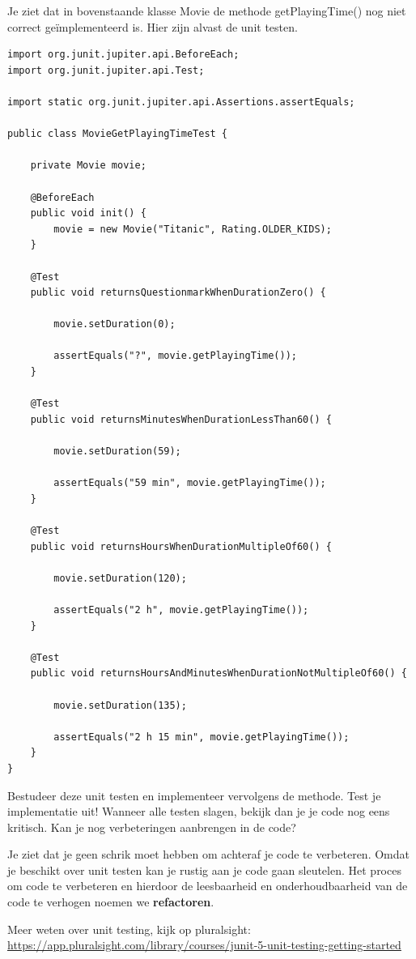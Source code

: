\begin{oefening}
Je ziet dat in bovenstaande klasse Movie de methode getPlayingTime() nog niet correct ge\"implementeerd is. Hier zijn alvast de unit testen. 

\begin{lstlisting}
import org.junit.jupiter.api.BeforeEach;
import org.junit.jupiter.api.Test;

import static org.junit.jupiter.api.Assertions.assertEquals;

public class MovieGetPlayingTimeTest {

	private Movie movie;

	@BeforeEach
	public void init() {
		movie = new Movie("Titanic", Rating.OLDER_KIDS);
	}

	@Test
	public void returnsQuestionmarkWhenDurationZero() {

		movie.setDuration(0);

		assertEquals("?", movie.getPlayingTime());
	}

	@Test
	public void returnsMinutesWhenDurationLessThan60() {

		movie.setDuration(59);

		assertEquals("59 min", movie.getPlayingTime());
	}

	@Test
	public void returnsHoursWhenDurationMultipleOf60() {

		movie.setDuration(120);

		assertEquals("2 h", movie.getPlayingTime());
	}

	@Test
	public void returnsHoursAndMinutesWhenDurationNotMultipleOf60() {

		movie.setDuration(135);

		assertEquals("2 h 15 min", movie.getPlayingTime());
	}
}
\end{lstlisting}

Bestudeer deze unit testen en implementeer vervolgens de methode. Test je implementatie uit! Wanneer alle testen slagen, bekijk dan je je code nog eens kritisch. Kan je nog verbeteringen aanbrengen in de code?
\end{oefening}

Je ziet dat je geen schrik moet hebben om achteraf je code te verbeteren. Omdat je beschikt over unit testen kan je rustig aan je code gaan sleutelen. Het proces om code te verbeteren en hierdoor de leesbaarheid en onderhoudbaarheid van de code te verhogen noemen we \textbf{refactoren}. 

 Meer weten over unit testing, kijk op pluralsight: \url{https://app.pluralsight.com/library/courses/junit-5-unit-testing-getting-started}

